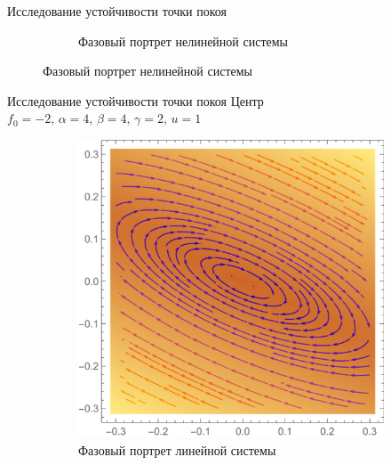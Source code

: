 \documentclass{beamer}
\begin{document}
\begin{frame}{Исследование устойчивости точки покоя}
\begin{figure}[H]
\begin{subfigure}[H]{0.4\textwidth}
			\captionsetup{labelformat=empty}
			\caption{Фазовый портрет нелинейной системы}
		\end{subfigure}	
	\end{figure}
\end{frame}

\begin{frame}{Исследование устойчивости точки покоя}
	\centering
	\large
	Центр
	$f_0=-2,\,\alpha=4,\,\beta=4,\,\gamma=2,\,u=1$
		\begin{figure}[H]
		\centering
		\begin{subfigure}[H]{0.4\textwidth}
			\includegraphics[width=\textwidth]{p6}
			\captionsetup{labelformat=empty}
			\caption{Фазовый портрет линейной системы}
		\end{subfigure}
		\qquad\qquad
		\begin{subfigure}[H]{0.4\textwidth}

\end{subfigure}
\end{figure}
\end{frame}
\end{document}
